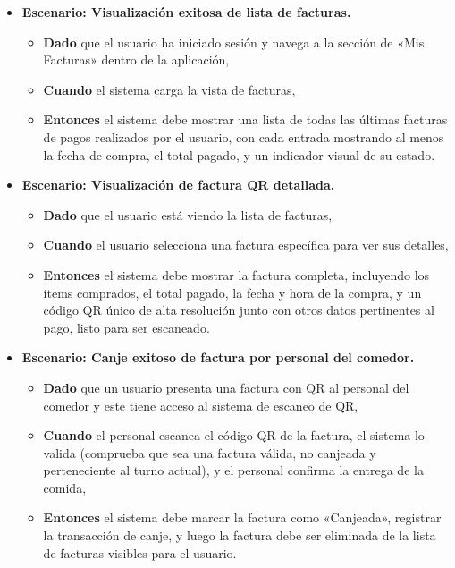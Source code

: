\documentclass[12pt]{article}
\begin{document}
\begin{itemize}
	\item \textbf{Escenario: Visualización exitosa de lista de facturas.}
	\begin{itemize}
		\item \textbf{Dado} que el usuario ha iniciado sesión y navega a la sección de «Mis Facturas» dentro de la aplicación,
		\item \textbf{Cuando} el sistema carga la vista de facturas,
		\item \textbf{Entonces} el sistema debe mostrar una lista de todas las últimas facturas de pagos realizados por el usuario, con cada entrada mostrando al menos la fecha de compra, el total pagado, y un indicador visual de su estado.
	\end{itemize}

	\item \textbf{Escenario: Visualización de factura QR detallada.}
	\begin{itemize}
		\item \textbf{Dado} que el usuario está viendo la lista de facturas,
		\item \textbf{Cuando} el usuario selecciona una factura específica para ver sus detalles,
		\item \textbf{Entonces} el sistema debe mostrar la factura completa, incluyendo los ítems comprados, el total pagado, la fecha y hora de la compra, y un código QR único de alta resolución junto con otros datos pertinentes al pago, listo para ser escaneado.
	\end{itemize}

	\item \textbf{Escenario: Canje exitoso de factura por personal del comedor.}
	\begin{itemize}
		\item \textbf{Dado} que un usuario presenta una factura con QR al personal del comedor y este tiene acceso al sistema de escaneo de QR,
		\item \textbf{Cuando} el personal escanea el código QR de la factura, el sistema lo valida (comprueba que sea una factura válida, no canjeada y perteneciente al turno actual), y el personal confirma la entrega de la comida,
		\item \textbf{Entonces} el sistema debe marcar la factura como «Canjeada», registrar la transacción de canje, y luego la factura debe ser eliminada de la lista de facturas visibles para el usuario.
	\end{itemize}


\end{itemize}
\end{document}

